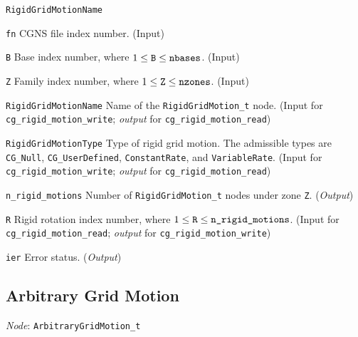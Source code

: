 \begin{Ventryi}{\texttt{RigidGridMotionName}}\raggedright
\item [\texttt{fn}]
      CGNS file index number.
      (\textcolor{input}{Input})
\item [\texttt{B}]
      Base index number, where $1 \leq \text{\texttt{B}} \leq \text{\texttt{nbases}}$.
      (\textcolor{input}{Input})
\item [\texttt{Z}]
      Family index number, where $1 \leq \text{\texttt{Z}} \leq \text{\texttt{nzones}}$.
      (\textcolor{input}{Input})
\item [\texttt{RigidGridMotionName}]
      Name of the \texttt{RigidGridMotion\_t} node.
      (\textcolor{input}{Input} for \texttt{cg\_rigid\_motion\_write};
      \textcolor{output}{\textit{output}} for \texttt{cg\_rigid\_motion\_read})
\item [\texttt{RigidGridMotionType}]
      Type of rigid grid motion.
      The admissible types are \texttt{CG\_Null}, \texttt{CG\_UserDefined},
      \texttt{ConstantRate}, and \texttt{VariableRate}.
      (\textcolor{input}{Input} for \texttt{cg\_rigid\_motion\_write};
      \textcolor{output}{\textit{output}} for \texttt{cg\_rigid\_motion\_read})
\item [\texttt{n\_rigid\_motions}]
      Number of \texttt{RigidGridMotion\_t} nodes under zone \texttt{Z}.
      (\textcolor{output}{\textit{Output}})
\item [\texttt{R}]
      Rigid rotation index number, where $1 \leq \text{\texttt{R}} \leq \text{\texttt{n\_rigid\_motions}}$.
      (\textcolor{input}{Input} for \texttt{cg\_rigid\_motion\_read};
      \textcolor{output}{\textit{output}} for \texttt{cg\_rigid\_motion\_write})
\item [\texttt{ier}]
      Error status.
      (\textcolor{output}{\textit{Output}})
\end{Ventryi}

\newpage
\subsection{Arbitrary Grid Motion}
\label{s:arbitrary}

\noindent
\textit{Node}: \texttt{ArbitraryGridMotion\_t}

